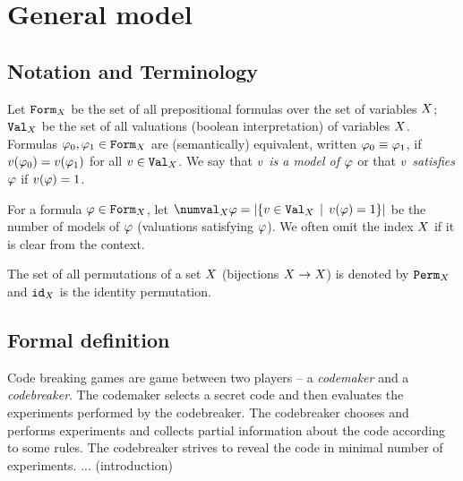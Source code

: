 \chapter{General model}

\section{Notation and Terminology}
Let $\mathtt{Form}_X$ be the set of all prepositional formulas over
  the set of variables $X$;
  $\mathtt{Val}_X$ be the set of all valuations (boolean interpretation)
  of variables $X$.
Formulas $\varphi_0, \varphi_1 \in \mathtt{Form}_X$ are (semantically) equivalent,
  written $\varphi_0 \equiv \varphi_1$, if
  $v(\varphi_0) = v(\varphi_1)$ for all $v\in\mathtt{Val}_X$.
We say that \emph{$v$ is a model of $\varphi$}
  or that \emph{$v$ satisfies $\varphi$}
  if $v(\varphi) = 1$.



For a formula $\varphi\in\mathtt{Form}_X$, let
  $\numval_\Var{\form} = |\{ \val\in\Val_\Var \| \val(\form) = 1 \}|$
  be the number of models of $\varphi$ (valuations satisfying $\varphi$).
We often omit the index $X$ if it is clear from the context.


The set of all permutations of a set $X$ (bijections $X->X$)
  is denoted by $\mathtt{Perm}_X$ and
  $\mathtt{id}_X$ is the identity permutation.

\section{Formal definition}

Code breaking games are game between two players -- a \emph{codemaker}
  and a \emph{codebreaker}.
The codemaker selects a secret code and then evaluates the experiments
  performed by the codebreaker.
The codebreaker chooses and performs experiments and collects partial
  information about the code according to some rules.
The codebreaker strives to reveal the code in minimal number of experiments.
... (introduction)

